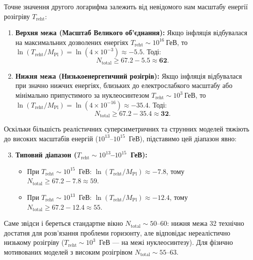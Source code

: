 Точне значення другого логарифма залежить від невідомого нам масштабу енергії розігріву $T_{\mathrm{reht}}$:
\begin{enumerate}
    \item \textbf{Верхня межа (Масштаб Великого об'єднання):} Якщо інфляція відбувалася на максимальних дозволених енергіях $T_{\mathrm{reht}} \sim 10^{16}~\text{ГеВ}$, то $\ln(T_{\mathrm{reht}}/M_{\mathrm{Pl}}) = \ln(4\times10^{-3}) \approx -5.5$. Тоді:
    \begin{equation}
    N_{\mathrm{total}} \ge 67.2 - 5.5 \approx \mathbf{62}.
    \end{equation}
    \item \textbf{Нижня межа (Низькоенергетичний розігрів):} Якщо інфляція відбувалася при значно нижчих енергіях, близьких до електрослабкого масштабу або мінімально припустимого за нуклеосинтезом $T_{\mathrm{reht}} \sim 10^{3}~\text{ГеВ}$, то $\ln(T_{\mathrm{reht}}/M_{\mathrm{Pl}}) = \ln(4\times10^{-16}) \approx -35.4$. Тоді:
    \begin{equation}
    N_{\mathrm{total}} \ge 67.2 - 35.4 \approx \mathbf{32}.
    \end{equation}
\end{enumerate}
Оскільки більшість реалістичних суперсиметричних та струнних моделей тяжіють до високих масштабів енергій ($10^{13}$--$10^{15}$~ГеВ), підставимо цей діапазон явно:
\begin{enumerate}
    \setcounter{enumi}{2}
    \item \textbf{Типовий діапазон ($T_{\mathrm{reht}} \sim 10^{13}$--$10^{15}$~ГеВ):}
    \begin{itemize}
        \item При $T_{\mathrm{reht}} \sim 10^{15}$~ГеВ: $\ln(T_{\mathrm{reht}}/M_{\mathrm{Pl}}) \approx -7.8$, тому $N_{\mathrm{total}} \ge 67.2 - 7.8 \approx 59$.
        \item При $T_{\mathrm{reht}} \sim 10^{13}$~ГеВ: $\ln(T_{\mathrm{reht}}/M_{\mathrm{Pl}}) \approx -12.4$, тому $N_{\mathrm{total}} \ge 67.2 - 12.4 \approx 55$.
    \end{itemize}
\end{enumerate}
Саме звідси і береться стандартне вікно $N_{\mathrm{total}} \sim 50$--$60$: нижня межа 32 технічно достатня для розв'язання проблеми горизонту, але відповідає нереалістично низькому розігріву ($T_{\mathrm{reht}} \sim 10^3$~ГеВ — на межі нуклеосинтезу). Для фізично мотивованих моделей з високим розігрівом $N_{\mathrm{total}} \sim 55$--$63$.



